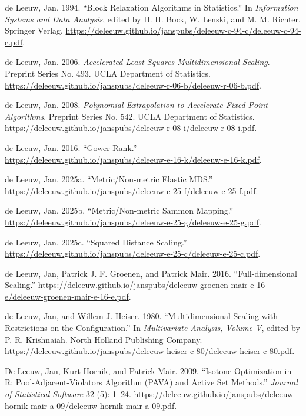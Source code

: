 \documentclass[
  12pt,
  letterpaper,
  DIV=11,
  numbers=noendperiod]{scrartcl}
\newlength{\cslhangindent}
\newenvironment{CSLReferences}[2] %
 {\begin{list}{}{%
  \setlength{\itemindent}{0pt}
  \setlength{\leftmargin}{0pt}
  \setlength{\parsep}{0pt}
  \ifodd #1
   \setlength{\leftmargin}{\cslhangindent}
   \setlength{\itemindent}{-1\cslhangindent}
  \fi
  \setlength{\itemsep}{#2\baselineskip}}}
 {\end{list}}
\begin{document}
\begin{CSLReferences}{1}{1}
{de Leeuw, Jan}. 1994. {``{Block Relaxation Algorithms in
Statistics}.''} In \emph{Information Systems and Data Analysis}, edited
by H. H. Bock, W. Lenski, and M. M. Richter. Springer Verlag.
\url{https://deleeuw.github.io/janspubs/deleeuw-c-94-c/deleeuw-c-94-c.pdf}.

{de Leeuw, Jan}. 2006. \emph{{Accelerated Least Squares Multidimensional
Scaling}}. Preprint Series No. 493. UCLA Department of Statistics.
\url{https://deleeuw.github.io/janspubs/deleeuw-r-06-b/deleeuw-r-06-b.pdf}.

{de Leeuw, Jan}. 2008. \emph{{Polynomial Extrapolation to Accelerate
Fixed Point Algorithms}}. Preprint Series No. 542. UCLA Department of
Statistics.
\url{https://deleeuw.github.io/janspubs/deleeuw-r-08-i/deleeuw-r-08-i.pdf}.

{de Leeuw, Jan}. 2016. {``{Gower Rank}.''}
\url{https://deleeuw.github.io/janspubs/deleeuw-e-16-k/deleeuw-e-16-k.pdf}.

{de Leeuw, Jan}. 2025a. {``{Metric/Non-metric Elastic MDS}.''}
\url{https://deleeuw.github.io/janspubs/deleeuw-e-25-f/deleeuw-e-25-f.pdf}.

{de Leeuw, Jan}. 2025b. {``{Metric/Non-metric Sammon Mapping}.''}
\url{https://deleeuw.github.io/janspubs/deleeuw-e-25-g/deleeuw-e-25-g.pdf}.

{de Leeuw, Jan}. 2025c. {``{Squared Distance Scaling}.''}
\url{https://deleeuw.github.io/janspubs/deleeuw-e-25-c/deleeuw-e-25-c.pdf}.

{de Leeuw, Jan, Patrick J. F. Groenen, and Patrick Mair}. 2016.
{``{Full-dimensional Scaling}.''}
\url{https://deleeuw.github.io/janspubs/deleeuw-groenen-mair-e-16-e/deleeuw-groenen-mair-e-16-e.pdf}.

{de Leeuw, Jan, and Willem J. Heiser}. 1980. {``{Multidimensional
Scaling with Restrictions on the Configuration}.''} In
\emph{Multivariate Analysis, Volume {V}}, edited by P. R. Krishnaiah.
North Holland Publishing Company.
\url{https://deleeuw.github.io/janspubs/deleeuw-heiser-c-80/deleeuw-heiser-c-80.pdf}.

De Leeuw, Jan, Kurt Hornik, and Patrick Mair. 2009. {``{Isotone
Optimization in R: Pool-Adjacent-Violators Algorithm (PAVA) and Active
Set Methods}.''} \emph{Journal of Statistical Software} 32 (5): 1--24.
\url{https://deleeuw.github.io/janspubs/deleeuw-hornik-mair-a-09/deleeuw-hornik-mair-a-09.pdf}.


\end{CSLReferences}
\end{document}
